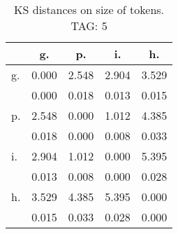 \begin{table}[h!]
\begin{center}
\begin{tabular}{| l | c | c | c | c |}\hline
 & g. & p. & i. & h. \\\hline
g. & 0.000  & 2.548  & 2.904  & 3.529 \\\hline
 & 0.000  & 0.018  & 0.013  & 0.015 \\\hline
p. & 2.548  & 0.000  & 1.012  & 4.385 \\\hline
 & 0.018  & 0.000  & 0.008  & 0.033 \\\hline
i. & 2.904  & 1.012  & 0.000  & 5.395 \\\hline
 & 0.013  & 0.008  & 0.000  & 0.028 \\\hline
h. & 3.529  & 4.385  & 5.395  & 0.000 \\\hline
 & 0.015  & 0.033  & 0.028  & 0.000 \\\hline
\end{tabular}
\caption{KS distances on size of tokens. TAG: 5}
\end{center}
\end{table}